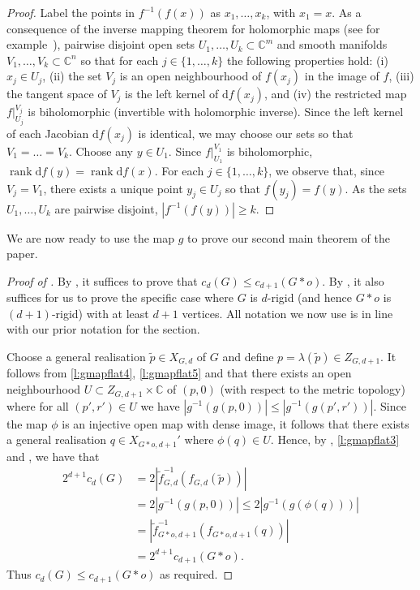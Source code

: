 \documentclass[ALCO]{cedram}
\DeclareMathOperator{\rank}{rank}
\newcommand{\diff}{\mathrm{d}}
\begin{document}
\begin{proof}
	Label the points in $f^{-1}(f(x))$ as $x_1,\ldots, x_k$,
	with $x_1 = x$.
	As a consequence of the inverse mapping theorem for holomorphic maps (see for example~\cite[Chapter~I, Theorem~7.5]{FG02}),
	pairwise disjoint open sets $U_1,\ldots , U_k \subset \mathbb{C}^m$ and smooth manifolds $V_1,\ldots,V_k \subset \mathbb{C}^n$ so that for each $j \in \{1,\ldots,k\}$ the following properties hold:
	(i) $x_j \in U_j$,
	(ii) the set $V_j$ is an open neighbourhood of $f(x_j)$ in the image of $f$,
	(iii) the tangent space of $V_j$ is the left kernel of $\diff f(x_j)$,
	and 
	(iv) the restricted map $f|_{U_j}^{V_j}$ is biholomorphic (\ie invertible with holomorphic inverse).
	Since the left kernel of each Jacobian $\diff f(x_j)$ is identical,
	we may choose our sets so that $V_1 = \ldots = V_k$.
	Choose any $y \in U_1$.
	Since $f|_{U_1}^{V_1}$ is biholomorphic,
	$\rank \diff f(y) = \rank \diff f(x)$.
	For each $j \in \{1,\ldots,k\}$,
	we observe that, since $V_j=V_1$,
	there exists a unique point $y_j \in U_j$ so that $f(y_j)=f(y)$.
	As the sets $U_1,\ldots , U_k$ are pairwise disjoint,
	$| f^{-1}(f(y))| \geq k$.
\end{proof}

We are now ready to use the map $g$ to prove our second main theorem of the paper.

\begin{proof}[Proof of ]
	By ,
	it suffices to prove that $c_d(G) \leq c_{d+1}(G*o)$.
	By ,
	it also suffices for us to prove the specific case where $G$ is $d$-rigid (and hence $G*o$ is $(d+1)$-rigid) with at least $d+1$ vertices.
	All notation we now use is in line with our prior notation for the section.
	
	Choose a general realisation $\tilde{p} \in X_{G,d}$ of $G$ and define $p = \lambda(\tilde{p}) \in Z_{G,d+1}$.
	It follows from \ref{l:gmapflat4}, \ref{l:gmapflat5} and  that there exists an open neighbourhood
	$U \subset Z_{G,d+1} \times \mathbb{C}$ of $(p,0)$ (with respect to the metric topology) where
	for all $(p',r') \in U$ we have $| g^{-1} (g(p,0)) | \leq | g^{-1}(g(p',r'))|$.
	Since the map $\phi$ is an injective open map with dense image,
	it follows that there exists a general realisation $q \in X_{G*o,d+1}'$ where $\phi(q) \in U$.
	Hence, by , \ref{l:gmapflat3} and ,
	we have that
	\begin{align*}
		2^{d+1} c_d(G) &= 2|\tilde{f}_{G,d}^{-1}(f_{G,d}(\tilde{p}))|
		\\
		&= 2|g^{-1}(g(p,0))|\leq 2|g^{-1}(g(\phi(q)))| \\
		&= |\tilde{f}_{G*o,d+1}^{-1}(f_{G*o,d+1}(q))| \\
		&= 2^{d+1} c_{d+1}(G*o).
	\end{align*}
	Thus $c_d(G) \leq c_{d+1}(G*o)$ as required.
\end{proof}
\end{document}
